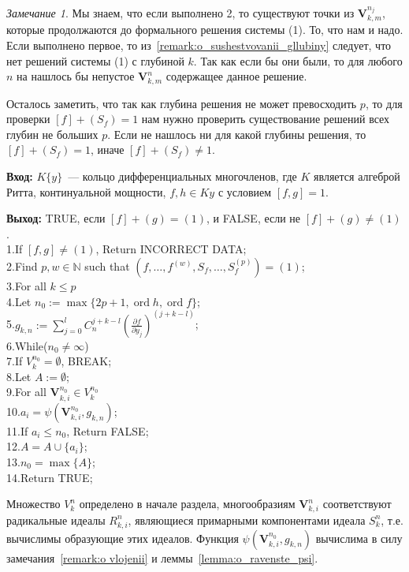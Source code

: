 \documentclass[16pt]{article}
\DeclareMathOperator{\ord}{ord}
\theoremstyle{plain}
\theoremstyle{definition}
\theoremstyle{remark}
\newtheorem{remark}[theorem]{Замечание}
\begin{document}
\begin{remark}
Мы знаем, что если выполнено 2, то существуют точки из $\mathbf{V}_{k,m}^{n_j}$, которые продолжаются до формального решения системы (1). То, что нам и надо. Если выполнено первое, то из~\ref{remark:o_sushestvovanii_gllubiny} следует, что нет решений системы (1)  с глубиной $k$. Так как если бы они были, то для любого $n$ на нашлось бы непустое $\mathbf{V}_{k,m}^{n}$ содержащее данное решение.

Осталось заметить, что так как глубина решения не может превосходить $p$, то для проверки $[f]+(S_f)=1$ нам нужно проверить существование решений всех глубин не больших $p$. Если не нашлось ни для какой глубины решения, то $[f]+(S_f)=1$, иначе $[f]+(S_f)\neq1$.
\end{remark}

{\bf Вход:} $K\{y\}$~--- кольцо дифференциальных многочленов, где $K$ является алгеброй Ритта, континуальной мощности, $f,h\in K{y}$ с условием $[f,g]=1$.

{\bf Выход:} TRUE, если  $[f]+(g)=(1)$, и FALSE, если не $[f]+(g)\not=(1)$.
\\
1.\qquad If $[f,g]\not=(1)$, Return  INCORRECT DATA;\\
2.\qquad Find $p,w\in \mathbb{N}$ such that $(f,\ldots,f^{(w)},S_f,\ldots,S_f^{(p)})=(1)$;\\
3.\qquad For all $k\leqslant p$\\
4.\qquad\qquad Let $n_0:=\max\{ 2p+1,\ord{h},\ord{f}\}$;\\
5.\qquad\qquad $g_{k,n}:=\sum\limits_{j=0}^{l}C_n^{j+k - l }\left(\frac{\partial f}{\partial y_j}\right)^{(j+k - l)}$;\\
6.\qquad\qquad While($n_0\not=\infty$)\\
7.\qquad\qquad\qquad If $V_k^{n_0}=\emptyset$, BREAK;\\
8.\qquad\qquad\qquad Let $A:=\emptyset$;\\
9.\qquad\qquad\qquad For all $\mathbf{V}_{k,i}^{n_0}\in V_k^{n_0}$\\
10.\qquad\qquad\qquad\qquad $a_i=\psi(\mathbf{V}_{k,i}^{n_0},g_{k,n})$;\\
11.\qquad\qquad\qquad\qquad If $a_i\leqslant n_0$, Return FALSE;\\
12.\qquad\qquad\qquad\qquad $A=A\cup\{a_i\}$;\\
13.\qquad\qquad\qquad $n_0=\max\{A\}$;\\
14.\qquad Return TRUE;

Множество $V_k^{n}$ определено в начале раздела, многообразиям $\mathbf{V}_{k,i}^{n}$ соответствуют радикальные идеалы $R_{k,i}^{n}$, являющиеся примарными компонентами идеала $S_k^n$, т.е. вычислимы образующие этих идеалов. 
Функция $\psi(\mathbf{V}_{k,i}^{n_0},g_{k,n})$ вычислима в силу замечания~\ref{remark:o vlojenii} и леммы~\ref{lemma:o_ravenste_psi}.
\end{document}
